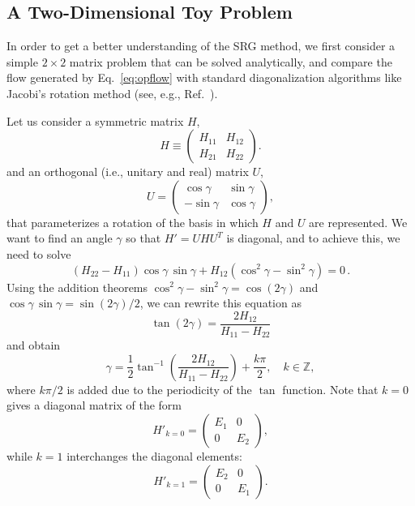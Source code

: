 {%
\subsection{\label{sec:srg_toy}A Two-Dimensional Toy Problem}

In order to get a better understanding of the SRG method, we first consider  
a simple $2\times 2$ matrix problem that can be solved analytically, and 
compare the flow generated by Eq.~\eqref{eq:opflow} with standard 
diagonalization algorithms like Jacobi's rotation method (see, e.g., 
Ref.~\cite{Golub:2013le}).

Let us consider a symmetric matrix $H$, 
\begin{equation} 
  H \equiv \begin{pmatrix} H_{11} & H_{12} \\ H_{21} & H_{22}\end{pmatrix}. 
\end{equation}
and an orthogonal (i.e., unitary and real) matrix $U$,
\begin{equation}
  U = \begin{pmatrix} \cos\gamma & \sin\gamma \\ -\sin\gamma & \cos\gamma \end{pmatrix}, 
\end{equation}
that parameterizes a rotation of the basis in which $H$ and $U$ are
represented. We want to find an angle $\gamma$ so that $H' = UHU^T$ is diagonal, 
and to achieve this, we need to solve
\begin{equation}
(H_{22} - H_{11})\cos\gamma\,\sin\gamma + H_{12}(\cos^2\gamma - \sin^2\gamma) = 0\,.
\end{equation}
Using the addition theorems $\cos^2\gamma-\sin^2\gamma = \cos(2\gamma)$ and 
$\cos\gamma\,\sin\gamma = \sin(2\gamma)/2$, we can rewrite this equation as
\begin{equation}
  \tan(2\gamma) = \frac{2 H_{12}}{H_{11}-H_{22}}
\end{equation}
and obtain
\begin{equation} 
\gamma = \frac{1}{2} \tan^{-1} \left( \frac{2H_{12}}{H_{11}-H_{22}}
\right) + \frac{k\pi}{2}, \quad k \in \mathbb{Z}, \label{eq:0} 
\end{equation}
where $k\pi/2$ is added due to the periodicity of the $\tan$ function.
Note that  $k=0$ gives a diagonal matrix of the form
\begin{equation} 
H'_{k=0} = \begin{pmatrix} E_1 & 0 \\ 0 & E_2 \end{pmatrix},
\label{eq:1} 
\end{equation}
while  $k=1$ interchanges the diagonal elements:  
\begin{equation} 
H'_{k=1} = \begin{pmatrix} E_2 & 0 \\ 0 & E_1 \end{pmatrix}.
\label{eq:2}
\end{equation}

}
